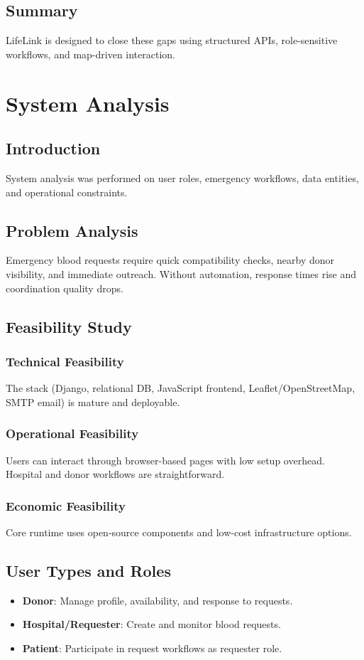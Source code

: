 \documentclass[12pt,a4paper]{report}
\begin{document}
\section{Summary}
LifeLink is designed to close these gaps using structured APIs, role-sensitive workflows, and map-driven interaction.

\chapter{System Analysis}
\section{Introduction}
System analysis was performed on user roles, emergency workflows, data entities, and operational constraints.

\section{Problem Analysis}
Emergency blood requests require quick compatibility checks, nearby donor visibility, and immediate outreach. Without automation, response times rise and coordination quality drops.

\section{Feasibility Study}
\subsection{Technical Feasibility}
The stack (Django, relational DB, JavaScript frontend, Leaflet/OpenStreetMap, SMTP email) is mature and deployable.

\subsection{Operational Feasibility}
Users can interact through browser-based pages with low setup overhead. Hospital and donor workflows are straightforward.

\subsection{Economic Feasibility}
Core runtime uses open-source components and low-cost infrastructure options.

\section{User Types and Roles}
\begin{itemize}[leftmargin=1.5em]
\item \textbf{Donor}: Manage profile, availability, and response to requests.
\item \textbf{Hospital/Requester}: Create and monitor blood requests.
\item \textbf{Patient}: Participate in request workflows as requester role.
\end{itemize}
\end{document}
